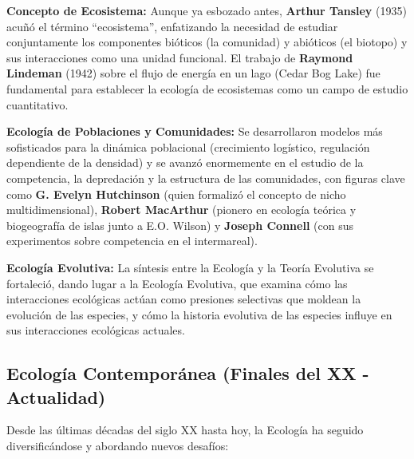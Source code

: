 \documentclass[
]{book}
\begin{document}
\textbf{Concepto de Ecosistema:} Aunque ya esbozado antes, \textbf{Arthur Tansley} (1935) acuñó el término ``ecosistema'', enfatizando la necesidad de estudiar conjuntamente los componentes bióticos (la comunidad) y abióticos (el biotopo) y sus interacciones como una unidad funcional. El trabajo de \textbf{Raymond Lindeman} (1942) sobre el flujo de energía en un lago (Cedar Bog Lake) fue fundamental para establecer la ecología de ecosistemas como un campo de estudio cuantitativo.

\textbf{Ecología de Poblaciones y Comunidades:} Se desarrollaron modelos más sofisticados para la dinámica poblacional (crecimiento logístico, regulación dependiente de la densidad) y se avanzó enormemente en el estudio de la competencia, la depredación y la estructura de las comunidades, con figuras clave como \textbf{G. Evelyn Hutchinson} (quien formalizó el concepto de nicho multidimensional), \textbf{Robert MacArthur} (pionero en ecología teórica y biogeografía de islas junto a E.O. Wilson) y \textbf{Joseph Connell} (con sus experimentos sobre competencia en el intermareal).

\textbf{Ecología Evolutiva:} La síntesis entre la Ecología y la Teoría Evolutiva se fortaleció, dando lugar a la Ecología Evolutiva, que examina cómo las interacciones ecológicas actúan como presiones selectivas que moldean la evolución de las especies, y cómo la historia evolutiva de las especies influye en sus interacciones ecológicas actuales.

\subsection*{\texorpdfstring{\textbf{Ecología Contemporánea (Finales del XX - Actualidad)}}{Ecología Contemporánea (Finales del XX - Actualidad)}}\label{contemp}

Desde las últimas décadas del siglo XX hasta hoy, la Ecología ha seguido diversificándose y abordando nuevos desafíos:
\end{document}
